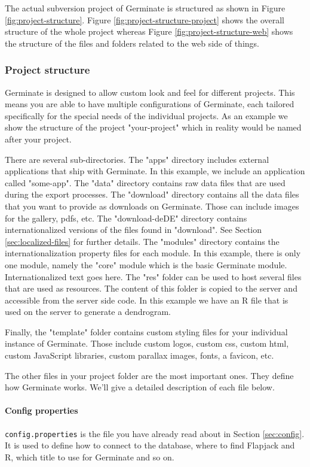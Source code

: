 \noindent
The actual subversion project of Germinate is structured as shown in Figure \ref{fig:project-structure}. Figure \ref{fig:project-structure-project} shows the overall structure of the whole project whereas Figure \ref{fig:project-structure-web} shows the structure of the files and folders related to the web side of things.

\subsubsection{Project structure}
Germinate is designed to allow custom look and feel for different projects. This means you are able to have multiple configurations of Germinate, each tailored specifically for the special needs of the individual projects. As an example we show the structure of the project "your-project" which in reality would be named after your project.

There are several sub-directories. The "apps" directory includes external applications that ship with Germinate. In this example, we include an application called "some-app". The "data" directory contains raw data files that are used during the export processes. The "download" directory contains all the data files that you want to provide as downloads on Germinate. Those can include images for the gallery, pdfs, etc. The "download-de\textunderscore DE" directory contains internationalized versions of the files found in "download". See Section \ref{sec:localized-files} for further details. The "modules" directory contains the internationalization property files for each module. In this example, there is only one module, namely the "core" module which is the basic Germinate module. Internationalized text goes here. The "res" folder can be used to host several files that are used as resources. The content of this folder is copied to the server and accessible from the server side code. In this example we have an R file that is used on the server to generate a dendrogram.

Finally, the "template" folder contains custom styling files for your individual instance of Germinate. Those include custom logos, custom css, custom html, custom JavaScript libraries, custom parallax images, fonts, a favicon, etc.

The other files in your project folder are the most important ones. They define how Germinate works. We'll give a detailed description of each file below.

\paragraph{Config properties}
\texttt{config.properties} is the file you have already read about in Section \ref{sec:config}. It is used to define how to connect to the database, where to find Flapjack and R, which title to use for Germinate and so on.

